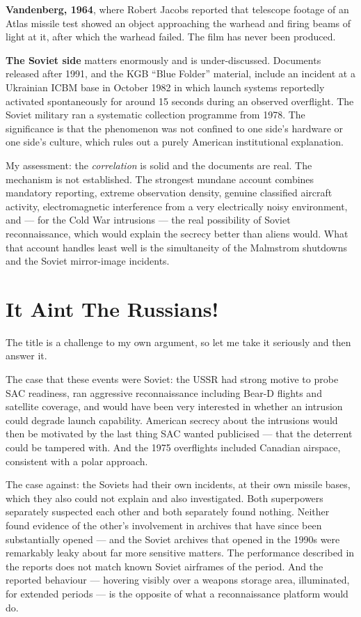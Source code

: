\textbf{Vandenberg, 1964}, where Robert Jacobs reported that telescope footage of an Atlas missile
test showed an object approaching the warhead and firing beams of light at it, after which the
warhead failed. The film has never been produced.

\textbf{The Soviet side} matters enormously and is under-discussed. Documents released after 1991,
and the KGB ``Blue Folder'' material, include an incident at a Ukrainian ICBM base in October 1982
in which launch systems reportedly activated spontaneously for around 15 seconds during an
observed overflight. The Soviet military ran a systematic collection programme from 1978. The
significance is that the phenomenon was not confined to one side's hardware or one side's culture,
which rules out a purely American institutional explanation.

My assessment: the \emph{correlation} is solid and the documents are real. The mechanism is not
established. The strongest mundane account combines mandatory reporting, extreme observation
density, genuine classified aircraft activity, electromagnetic interference from a very electrically
noisy environment, and --- for the Cold War intrusions --- the real possibility of Soviet
reconnaissance, which would explain the secrecy better than aliens would. What that account
handles least well is the simultaneity of the Malmstrom shutdowns and the Soviet mirror-image
incidents.

\section{It Aint The Russians!}\label{sec:aintrussians}

The title is a challenge to my own argument, so let me take it seriously and then answer it.

The case that these events were Soviet: the USSR had strong motive to probe SAC readiness, ran
aggressive reconnaissance including Bear-D flights and satellite coverage, and would have been
very interested in whether an intrusion could degrade launch capability. American secrecy about the
intrusions would then be motivated by the last thing SAC wanted publicised --- that the deterrent
could be tampered with. And the 1975 overflights included Canadian airspace, consistent with a
polar approach.

The case against: the Soviets had their own incidents, at their own missile bases, which they also
could not explain and also investigated. Both superpowers separately suspected each other and
both separately found nothing. Neither found evidence of the other's involvement in archives that
have since been substantially opened --- and the Soviet archives that opened in the 1990s were
remarkably leaky about far more sensitive matters. The performance described in the reports does
not match known Soviet airframes of the period. And the reported behaviour --- hovering visibly
over a weapons storage area, illuminated, for extended periods --- is the opposite of what a
reconnaissance platform would do.


